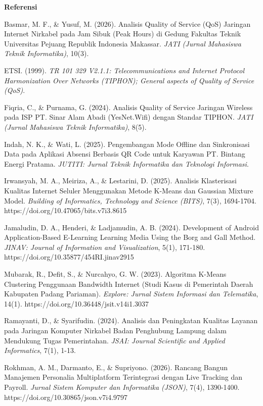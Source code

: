 \documentclass[11pt,a4paper]{article}
\newcommand{\judul}[1]{\begin{center}\textbf{\large #1}\end{center}}
\begin{document}
\judul{Referensi}
\begin{list}{}{\leftmargin=1cm \itemindent=-1cm \itemsep=4pt}
\item Basmar, M. F., \& Yusuf, M. (2026). Analisis Quality of Service (QoS) Jaringan Internet Nirkabel pada Jam Sibuk (Peak Hours) di Gedung Fakultas Teknik Universitas Pejuang Republik Indonesia Makassar. \textit{JATI (Jurnal Mahasiswa Teknik Informatika)}, 10(3).
\item ETSI. (1999). \textit{TR 101 329 V2.1.1: Telecommunications and Internet Protocol Harmonization Over Networks (TIPHON); General aspects of Quality of Service (QoS)}.
\item Fiqria, C., \& Purnama, G. (2024). Analisis Quality of Service Jaringan Wireless pada ISP PT. Sinar Alam Abadi (YesNet.Wifi) dengan Standar TIPHON. \textit{JATI (Jurnal Mahasiswa Teknik Informatika)}, 8(5).
\item Indah, N. K., \& Wati, L. (2025). Pengembangan Mode Offline dan Sinkronisasi Data pada Aplikasi Absensi Berbasis QR Code untuk Karyawan PT. Bintang Energi Pratama. \textit{JUTITI: Jurnal Teknik Informatika dan Teknologi Informasi}.
\item Irwansyah, M. A., Meiriza, A., \& Lestarini, D. (2025). Analisis Klasterisasi Kualitas Internet Seluler Menggunakan Metode K-Means dan Gaussian Mixture Model. \textit{Building of Informatics, Technology and Science (BITS)}, 7(3), 1694-1704. https://doi.org/10.47065/bits.v7i3.8615
\item Jamaludin, D. A., Henderi, \& Ladjamudin, A. B. (2024). Development of Android Application-Based E-Learning Learning Media Using the Borg and Gall Method. \textit{JINAV: Journal of Information and Visualization}, 5(1), 171-180. https://doi.org/10.35877/454RI.jinav2915
\item Mubarak, R., Defit, S., \& Nurcahyo, G. W. (2023). Algoritma K-Means Clustering Penggunaan Bandwidth Internet (Studi Kasus di Pemerintah Daerah Kabupaten Padang Pariaman). \textit{Explore: Jurnal Sistem Informasi dan Telematika}, 14(1). https://doi.org/10.36448/jsit.v14i1.3037
\item Ramayanti, D., \& Syarifudin. (2024). Analisis dan Peningkatan Kualitas Layanan pada Jaringan Komputer Nirkabel Badan Penghubung Lampung dalam Mendukung Tugas Pemerintahan. \textit{JSAI: Journal Scientific and Applied Informatics}, 7(1), 1-13.
\item Rokhman, A. M., Darmanto, E., \& Supriyono. (2026). Rancang Bangun Manajemen Personalia Multiplatform Terintegrasi dengan Live Tracking dan Payroll. \textit{Jurnal Sistem Komputer dan Informatika (JSON)}, 7(4), 1390-1400. https://doi.org/10.30865/json.v7i4.9797

\end{list}
\end{document}
